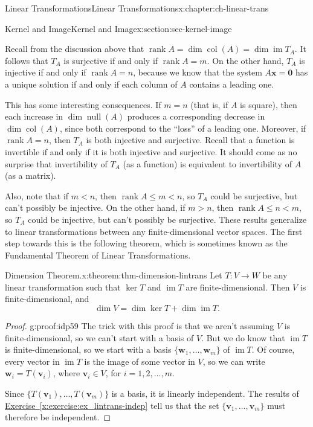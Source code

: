 \documentclass[oneside,10pt,]{book}
\newcommand{\xreffont}{\relax}
\numberwithin{equation}{section}
\newcommand{\im}{\operatorname{im}}
\newcommand{\nll}{\operatorname{null}}
\newcommand{\csp}{\operatorname{col}}
\newcommand{\rank}{\operatorname{rank}}
\newcommand{\vv}{\mathbf{v}}
\newcommand{\ww}{\mathbf{w}}
\newcommand{\xx}{\mathbf{x}}
\newcommand{\lt}{<}
\newcommand{\gt}{>}
\begin{document}
\begin{chapterptx}{Linear Transformations}{}{Linear Transformations}{}{}{x:chapter:ch-linear-trans}
\begin{sectionptx}{Kernel and Image}{}{Kernel and Image}{}{}{x:section:sec-kernel-image}
\par
Recall from the discussion above that \(\rank A = \dim \csp(A) = \dim \im T_A\). It follows that \(T_A\) is surjective if and only if \(\rank A = m\). On the other hand, \(T_A\) is injective if and only if \(\rank A = n\), because we know that the system \(A\xx=\mathbf{0}\) has a unique solution if and only if each column of \(A\) contains a leading one.%
\par
This has some interesting consequences. If \(m=n\) (that is, if \(A\) is square), then each increase in \(\dim \nll(A)\) produces a corresponding decrease in \(\dim \csp(A)\), since both correspond to the ``loss'' of a leading one. Moreover, if \(\rank A = n\), then \(T_A\) is both injective and surjective. Recall that a function is invertible if and only if it is both injective and surjective. It should come as no surprise that invertibility of \(T_A\) (as a function) is equivalent to invertibility of \(A\) (as a matrix).%
\par
Also, note that if \(m \lt n\), then \(\rank A\leq m \lt n\), so \(T_A\) could be surjective, but can't possibly be injective. On the other hand, if \(m\gt n\), then \(\rank A\leq n \lt m\), so \(T_A\) could be injective, but can't possibly be surjective. These results generalize to linear transformations between any finite-dimensional vector spaces. The first step towards this is the following theorem, which is sometimes known as the Fundamental Theorem of Linear Transformations.%
\begin{theorem}{Dimension Theorem.}{}{x:theorem:thm-dimension-lintrans}%
Let \(T:V\to W\) be any linear transformation such that \(\ker T\) and \(\im T\) are finite-dimensional. Then \(V\) is finite-dimensional, and%
\begin{equation*}
\dim V = \dim \ker T + \dim \im T\text{.}
\end{equation*}
%
\end{theorem}
\begin{proof}{}{g:proof:idp59}
The trick with this proof is that we aren't assuming \(V\) is finite-dimensional, so we can't start with a basis of \(V\). But we do know that \(\im T\) is finite-dimensional, so we start with a basis \(\{\ww_1,\ldots, \ww_m\}\) of \(\im T\). Of course, every vector in \(\im T\) is the image of some vector in \(V\), so we can write \(\ww_i =T(\vv_i)\), where \(\vv_i\in V\), for \(i=1,2,\ldots, m\).%
\par
Since \(\{T(\vv_1),\ldots, T(\vv_m)\}\) is a basis, it is linearly independent. The results of \hyperref[x:exercise:ex_lintrans-indep]{Exercise~{\xreffont\ref{x:exercise:ex_lintrans-indep}}} tell us that the set \(\{\vv_1,\ldots, \vv_m\}\) must therefore be independent.%

\end{proof}
\end{sectionptx}
\end{chapterptx}
\end{document}
